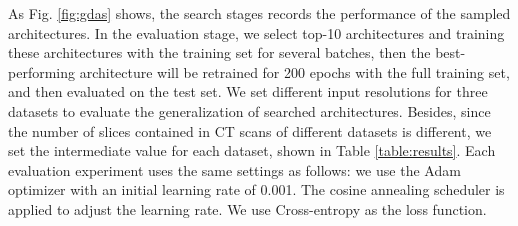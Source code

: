 \documentclass[letterpaper]{article}
\begin{document}
As Fig. \ref{fig:gdas} shows, the search stages records the performance of the sampled architectures. In the evaluation stage, we select top-10 architectures and training these architectures with the training set for several batches, then the best-performing architecture will be retrained for 200 epochs with the full training set, and then evaluated on the test set. We set different input resolutions for three datasets to evaluate the generalization of searched architectures. Besides, since the number of slices contained in CT scans of different datasets is different, we set the intermediate value for each dataset, shown in Table \ref{table:results}. Each evaluation experiment uses the same settings as follows: we use the Adam \cite{adam} optimizer with an initial learning rate of 0.001. The cosine annealing scheduler \cite{cosineannealinglr} is applied to adjust the learning rate. We use Cross-entropy as the loss function.
\end{document}
